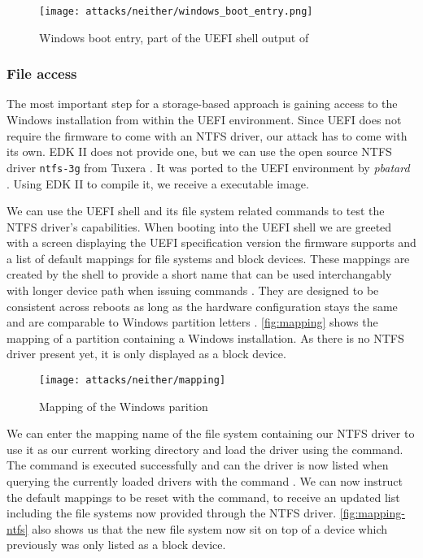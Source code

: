 \begin{figure}[htb]
    \centering
    \texttt{[image: attacks/neither/windows\_boot\_entry.png]}
    \caption{Windows boot entry, part of the \ac{UEFI} shell output of }
    \label{fig:windows-boot-entry}
\end{figure}

\subsubsection{File access}

The most important step for a storage-based approach is gaining access to the Windows installation from within the \ac{UEFI} environment.
Since \ac{UEFI} does not require the firmware to come with an \ac{NTFS} driver, our attack has to come with its own.
\ac{EDK} II does not provide one, but we can use the open source \ac{NTFS} driver \lstinline{ntfs-3g} from Tuxera \cite{ntfs-3g}.
It was ported to the \ac{UEFI} environment by \emph{pbatard} \cite{ntfs-3g-uefi}.
Using \ac{EDK} II to compile it, we receive a  executable image.

We can use the \ac{UEFI} shell and its file system related commands to test the \ac{NTFS} driver's capabilities.
When booting into the \ac{UEFI} shell we are greeted with a screen displaying the \ac{UEFI} specification version the firmware supports and a list of default mappings for file systems and block devices.
These mappings are created by the shell to provide a short name that can be used interchangably with longer device path when issuing commands \cite[Section 3.7.2]{uefi-shell-spec}.
They are designed to be consistent across reboots as long as the hardware configuration stays the same and are comparable to Windows partition letters \cite[Appendix A]{uefi-shell-spec}.
\autoref{fig:mapping} shows the mapping of a partition containing a Windows installation.
As there is no \ac{NTFS} driver present yet, it is only displayed as a block device.

\begin{figure}[htb]
    \centering
    \texttt{[image: attacks/neither/mapping]}
    \caption{Mapping of the Windows parition}
    \label{fig:mapping}
\end{figure}

We can enter the mapping name of the file system containing our \ac{NTFS} driver to use it as our current working directory and load the driver using the  command.
The command is executed successfully and can the driver is now listed when querying the currently loaded drivers with the command .
We can now instruct the default mappings to be reset with the  command, to receive an updated list including the file systems now provided through the \ac{NTFS} driver.
\autoref{fig:mapping-ntfs} also shows us that the new file system now sit on top of a device which previously was only listed as a block device.

